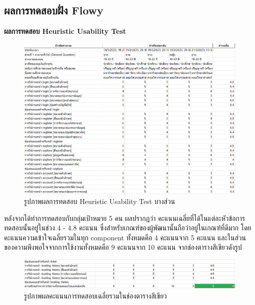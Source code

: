 \subsection{ผลการทดสอบฝั่ง Flowy}
\textbf{ผลการทดสอบ Heuristic Usability Test}
\begin{figure}[h]
    \begin{center}
    \includegraphics[width=\linewidth]{./image/heuristic_usability_test.png}
    \end{center}
    \caption[Heuristic Usability Test]{รูปภาพผลการทดสอบ Heuristic Usability Test บางส่วน}
    \label{fig:heuristic_usability_test}
\end{figure}

หลังจากได้ทำการทดสอบกับกลุ่มเป้าหมาย 5 คน ผลปรากฎว่า คะแนนเฉลี่ยที่ได้ในแต่ละหัวข้อการทดสอบนั้นอยู่ในช่วง 4 - 4.8 คะแนน ซึ่งสำหรับเกณฑ์ของผู้พัฒนานั้นถือว่าอยู่ในเกณฑ์ที่ดีมาก โดยคะแนนความเข้าใจเฉลี่ยรวมในทุก component ทั้งหมดคือ 4 คะแนนจาก 5 คะแนน และในส่วนของความพึงพอใจจากการใช้งานทั้งหมดคือ 9 คะแนนจาก 10 คะแนน จากช่องตารางสีเขียวดังรูป

\begin{figure}[h]
    \begin{center}
    \includegraphics[width=\linewidth]{./image/heuristic_result.png}
    \end{center}
    \caption[Heuristic result]{รูปภาพผลคะแนนการทดสอบเฉลี่ยรวมในช่องตารางสีเขียว}
    \label{fig:heuristic_result}
\end{figure}

